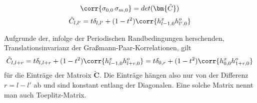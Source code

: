 \begin{grayframe}[frametitle = {Exakte Lösung für Spin-Spin-Korrelation}]
\begin{equation}
 \corr{\sigma_{0,0}\, \sigma_{m,0}} = det(\bm{\tilde{C}})
\end{equation}
\begin{equation}
\tilde{C}_{l,l'} = t \delta_{l,l'} + (1-t^2) \corr{h_{l-1,0}^x h_{l',0}^o}
\end{equation}
\end{grayframe}

Aufgrunde der, infolge der Periodischen Randbedingungen herschenden, Translationsinvarianz der Graßmann-Paar-Korrelationen, gilt
\begin{equation}
\tilde{C}_{l,l+r} = t \delta_{l,l+r} + (1-t^2) \corr{h_{l-1,0}^x h_{l + r,0}^o} = t \delta_{0,r} + (1-t^2) \corr{h_{0,0}^x h_{1+r,0}^o}
\end{equation}
für die Einträge der Matroix $\bm{\tilde{C}}$. Die Einträge hängen also nur von der Differenz $r = l-l'$ ab und sind konstant entlang der Diagonalen. Eine solche Matrix nennt man auch Toeplitz-Matrix.